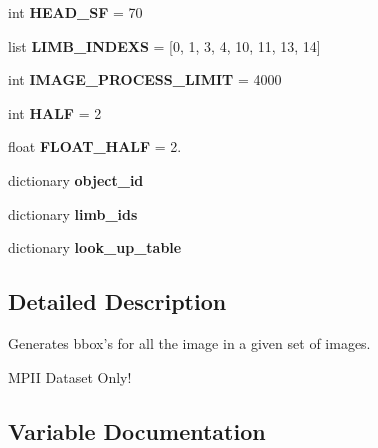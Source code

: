 \begin{DoxyCompactItemize}
int {\bfseries H\+E\+A\+D\+\_\+\+SF} = 70
\item 
\mbox{\label{namespacesrc_1_1busniess_1_1generate__limb__bbox__darkflow_a12cb0649ed696943426c8600167489d2}} 
list {\bfseries L\+I\+M\+B\+\_\+\+I\+N\+D\+E\+XS} = \mbox{[}0, 1, 3, 4, 10, 11, 13, 14\mbox{]}
\item 
\mbox{\label{namespacesrc_1_1busniess_1_1generate__limb__bbox__darkflow_a55f8e43c205346664443acc6dbf8ad2c}} 
int {\bfseries I\+M\+A\+G\+E\+\_\+\+P\+R\+O\+C\+E\+S\+S\+\_\+\+L\+I\+M\+IT} = 4000
\item 
\mbox{\label{namespacesrc_1_1busniess_1_1generate__limb__bbox__darkflow_aa03242f16fe2c8e8d2b55a713fbef132}} 
int {\bfseries H\+A\+LF} = 2
\item 
\mbox{\label{namespacesrc_1_1busniess_1_1generate__limb__bbox__darkflow_a5d4e47b00ededdab6e55860cebfc215e}} 
float {\bfseries F\+L\+O\+A\+T\+\_\+\+H\+A\+LF} = 2.
\item 
dictionary {\bfseries object\+\_\+id}
\item 
dictionary {\bfseries limb\+\_\+ids}
\item 
dictionary {\bfseries look\+\_\+up\+\_\+table}
\end{DoxyCompactItemize}


\subsection{Detailed Description}
\begin{DoxyVerb}Generates bbox's for all the image in a given set of images.

MPII Dataset Only!\end{DoxyVerb}
 

\subsection{Variable Documentation}
\mbox{\label{namespacesrc_1_1busniess_1_1generate__limb__bbox__darkflow_a7cb73c6ec274a8cf4f93ecefe2b5a27e}} 
